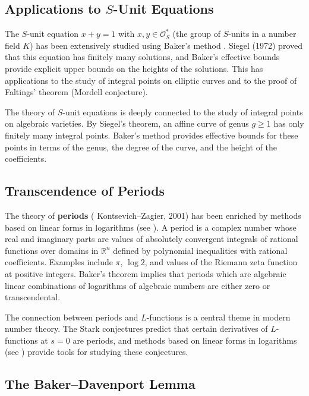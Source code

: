 \subsection*{Applications to $S$-Unit Equations}

The $S$-unit equation $x + y = 1$ with $x, y \in \mathcal{O}_S^*$ (the group of $S$-units in a number field $K$) has been extensively studied using Baker's method \cite{baker1966}. Siegel (1972) proved that this equation has finitely many solutions, and Baker's effective bounds provide explicit upper bounds on the heights of the solutions. This has applications to the study of integral points on elliptic curves and to the proof of Faltings' theorem (Mordell conjecture).

The theory of $S$-unit equations is deeply connected to the study of integral points on algebraic varieties. By Siegel's theorem, an affine curve of genus $g \geq 1$ has only finitely many integral points. Baker's method \cite{baker1966} provides effective bounds for these points in terms of the genus, the degree of the curve, and the height of the coefficients.

\subsection*{Transcendence of Periods}

The theory of \textbf{periods} ( Kontsevich--Zagier, 2001) has been enriched by methods based on linear forms in logarithms (see \cite{baker1966}). A period is a complex number whose real and imaginary parts are values of absolutely convergent integrals of rational functions over domains in $\mathbb{R}^n$ defined by polynomial inequalities with rational coefficients. Examples include $\pi$, $\log 2$, and values of the Riemann zeta function at positive integers. Baker's theorem implies that periods which are algebraic linear combinations of logarithms of algebraic numbers are either zero or transcendental.

The connection between periods and $L$-functions is a central theme in modern number theory. The Stark conjectures predict that certain derivatives of $L$-functions at $s = 0$ are periods, and methods based on linear forms in logarithms (see \cite{baker1966}) provide tools for studying these conjectures.

\subsection*{The Baker--Davenport Lemma}

